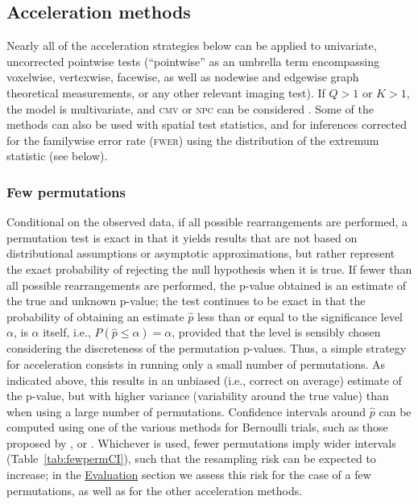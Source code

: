 \subsection{Acceleration methods}

Nearly all of the acceleration strategies below can be applied to univariate, uncorrected pointwise tests (``pointwise'' as an umbrella term encompassing voxelwise, vertexwise, facewise, as well as nodewise and edgewise graph theoretical measurements, or any other relevant imaging test). If $Q>1$ or $K>1$, the model is multivariate, and \textsc{cmv} or \textsc{npc} can be considered \citep{Winkler2016_npc}. Some of the methods can also be used with spatial test statistics, and for inferences corrected for the familywise error rate (\textsc{fwer}) using the distribution of the extremum statistic (see below).

\subsubsection{Few permutations}
\label{sec:accel:fewperms}

Conditional on the observed data, if all possible rearrangements are performed, a permutation test is exact in that it yields results that are not based on distributional assumptions or asymptotic approximations, but rather represent the exact probability of rejecting the null hypothesis when it is true. If fewer than all possible rearrangements are performed, the p-value obtained is an estimate of the true and unknown p-value; the test continues to be exact in that the probability of obtaining an estimate $\hat{p}$ less than or equal to the significance level $\alpha$, is $\alpha$ itself, i.e., $P(\hat{p}\leqslant\alpha)=\alpha$, provided that the level is sensibly chosen considering the discreteness of the permutation p-values. Thus, a simple strategy for acceleration consists in running only a small number of permutations. As indicated above, this results in an unbiased (i.e., correct on average) estimate of the p-value, but with higher variance (variability around the true value) than when using a large number of permutations. Confidence intervals around $\hat{p}$ can be computed using one of the various methods for Bernoulli trials, such as those proposed by \citet{Wilson1927}, \citet{Clopper1934} or \citet{Agresti1998} \citep[for a comparative review, see][]{Brown2001}. Whichever is used, fewer permutations imply wider intervals (Table~\ref{tab:fewpermCI}), such that the resampling risk can be expected to increase; in the \href{sec:accel:evaluation}{Evaluation} section we assess this risk for the case of a few permutations, as well as for the other acceleration methods.

